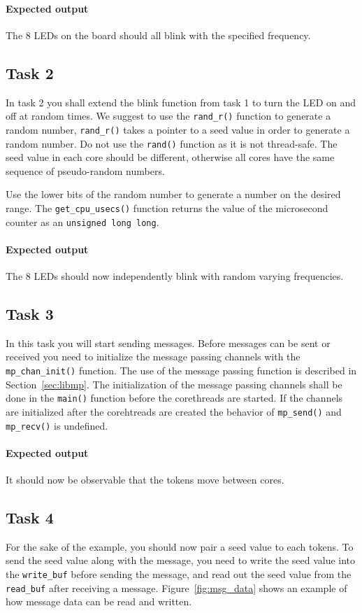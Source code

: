 \documentclass[a4paper,fontsize=10pt,twoside,DIV15,BCOR12mm,headinclude=true,footinclude=false,pagesize,bibtotoc]{scrbook}
\newcommand{\code}[1]{{\texttt{#1}}}
\begin{document}
\paragraph*{Expected output}
The 8 LEDs on the board should all blink with the specified frequency.

\subsection{Task 2}
In task 2 you shall extend the blink function from task 1 to turn the LED on and off at random times.
We suggest to use the \code{rand\_r()} function to generate a random number,
\code{rand\_r()} takes a pointer to a seed value in order to generate a random number.
Do not use the \code{rand()} function as it is not thread-safe.
The seed value in each core should be different, otherwise all cores have the
same sequence of pseudo-random numbers.

Use the lower bits of the random number to generate a number on the desired range.
The \code{get\_cpu\_usecs()} function returns the value of the microsecond counter as an \code{unsigned long long}. 

\paragraph*{Expected output}
The 8 LEDs should now independently blink with random varying frequencies.

\subsection{Task 3}
In this task you will start sending messages.
Before messages can be sent or received you need to initialize the message passing channels with the \code{mp\_chan\_init()} function.
The use of the message passing function is described in Section~\ref{sec:libmp}.
The initialization of the message passing channels shall be done in the \code{main()} function before the corethreads are started.
If the channels are initialized after the corehtreads are created the behavior of
\code{mp\_send()} and \code{mp\_recv()} is undefined.


\paragraph*{Expected output}
It should now be observable that the tokens move between cores.

\subsection{Task 4}
For the sake of the example, you should now pair a seed value to each tokens.
To send the seed value along with the message, you need to write the seed value into
the \code{write\_buf} before sending the message, and read out the seed value from the \code{read\_buf}
after receiving a message.
Figure~\ref{fig:msg_data} shows an example of how message data can be read and written.
\end{document}

